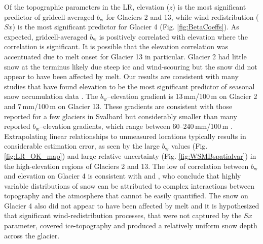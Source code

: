 \documentclass[twocolumn, letterpaper]{igs}
\begin{document}
Of the topographic parameters in the LR, elevation ($z$) is the most significant predictor of gridcell-averaged $b_\mathrm{w}$ for Glaciers 2 and 13, while wind redistribution ($Sx$) is the most significant predictor for Glacier 4 (Fig. \ref{fig:BetaCoeffs}). As expected, gridcell-averaged $b_\mathrm{w}$ is positively correlated with elevation where the correlation is significant. It is possible that the elevation correlation was accentuated due to melt onset for Glacier 13 in particular. Glacier 2 had little snow at the terminus likely due steep ice and wind-scouring but the snow did not appear to have been affected by melt.  Our results are consistent with many studies that have found elevation to be the most significant predictor of seasonal snow accumulation data \citep[e.g.][]{Machguth2006, Grunewald2014, McGrath2015}. The $b_\mathrm{w}$--elevation gradient is 13\,mm/100\,m on Glacier 2 and 7\,mm/100\,m on Glacier 13. These gradients are consistent with those reported for a few glaciers in Svalbard \citep{Winther1998} but considerably smaller than many reported $b_\mathrm{w}$--elevation gradients, which range between 60--240\,mm/100\,m \citep[e.g.][]{Hagen1990,Tveit1996,Winther1998}. Extrapolating linear relationships to unmeasured locations typically results in considerable estimation error, as seen by the large $b_\mathrm{w}$ values (Fig. \ref{fig:LR_OK_map}) and large relative uncertainty (Fig. \ref{fig:WSMBspatialvar}) in the high-elevation regions of Glaciers 2 and 13. The low of correlation between $b_\mathrm{w}$ and elevation on Glacier 4 is consistent with \cite{Grabiec2011} and \cite{Lopez2011}, who conclude that highly variable distributions of snow can be attributed to complex interactions between topography and the atmosphere that cannot be easily quantified. The snow on Glacier 4 also did not appear to have been affected by melt and it is hypothesized that significant wind-redistribution processes, that were not captured by the $Sx$ parameter, covered ice-topography and produced a relatively uniform snow depth across the glacier.
\end{document}
